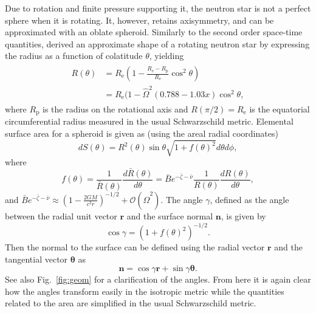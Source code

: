 \documentclass[iop, usenatbib]{emulateapj}
\newcommand{\be}{\begin{equation}}
\newcommand{\ee}{\end{equation}}
\renewcommand{\vec}[1]{\ensuremath{\boldsymbol{#1}}​}
\newcommand{\Req}{\ensuremath{R_{\mathrm{e}}}}
\newcommand{\sch}{Schwarzschild }
\newcommand{\Ob}{\ensuremath{\hat{\Omega}}}
\newcommand{\nub}{\ensuremath{\bar{\nu}}}
\newcommand{\zetab}{\ensuremath{\bar{\zeta}}}
\newcommand{\Bb}{\ensuremath{\bar{B}}}
\begin{document}
Due to rotation and finite pressure supporting it, the neutron star is not a perfect sphere when it is rotating.  
It, however, retains axisymmetry, and can be approximated with an oblate spheroid.  
Similarly to the second order space-time quantities, \citet{aGM14} derived an approximate shape of a rotating neutron star by expressing the radius as a function of colatitude $\theta$, yielding
\begin{align}\begin{split}\label{eq:radf}
    R(\theta) &= \Req \left( 1 - \frac{\Req - R_{\mathrm{p}}}{\Req} \cos^2\theta \right) \\
              &= \Req (1-\Ob^2 (0.788 - 1.03x) \cos^2 \theta,
\end{split}\end{align}
where $R_{\mathrm{p}}$ is the radius on the rotational axis and $R(\pi/2) = \Req$ is the equatorial circumferential radius measured in the usual \sch metric. 
Elemental surface area for a spheroid is given as (using the areal radial coordinates)
\be
dS(\theta) = R^2(\theta) \sin\theta \sqrt{1 + f(\theta)^2}d\theta d\phi,
\ee
where
\be
f(\theta) = \frac{1}{\bar{R}(\theta)} \frac{d \bar{R}(\theta)}{d \theta} 
= \Bb e^{-\zetab-\nub} \frac{1}{R(\theta)} \frac{dR(\theta)}{d\theta}, 
\ee
and $\Bb e^{-\zetab-\nub} \approx \left(1-\frac{2 G M}{c^2 r}\right)^{-1/2} + \mathcal{O}(\Ob^2)$.
The angle $\gamma$, defined as the angle between the radial unit vector $\vec{r}$ and the surface normal $\vec{n}$, is given by
\be
\cos\gamma = \left(1 + f(\theta)^2\right)^{-1/2}.
\ee
Then the normal to the surface can be defined using the radial vector $\vec{r}$ and the tangential vector $\vec{\theta}$ as
\be
\vec{n} = \cos\gamma \vec{r} + \sin\gamma \vec{\theta}.
\ee
See also Fig.~\ref{fig:geom} for a clarification of the angles.
From here it is again clear how the angles transform easily in the isotropic metric while the quantities related to the area are simplified in the usual \sch metric.
\end{document}
